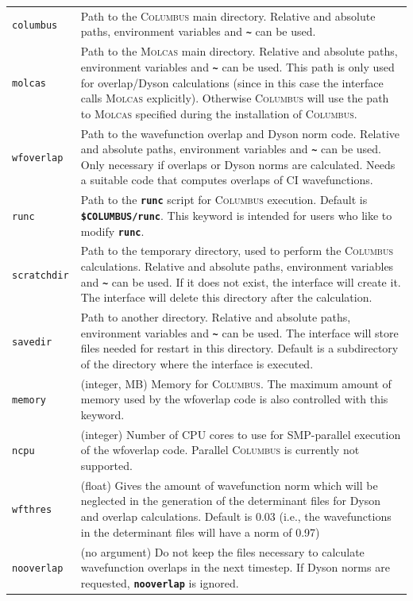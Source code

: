 \documentclass[a4paper,11pt,DIV=15,openany,twoside=false]{scrbook}
\newcommand{\ttt}[1]{\textbf{\texttt{#1}}}
\begin{document}
\begin{longtable}{>{\tt}lp{12cm}}
columbus        &Path to the \textsc{Columbus} main directory. Relative and absolute paths, environment variables and \ttt{\textasciitilde} can be used.\\
molcas          &Path to the \textsc{Molcas} main directory.  Relative and absolute paths, environment variables and \ttt{\textasciitilde} can be used. This path is only used for overlap/Dyson calculations (since in this case the interface calls \textsc{Molcas} explicitly). Otherwise \textsc{Columbus} will use the path to \textsc{Molcas} specified during the installation of \textsc{Columbus}.\\
wfoverlap       &Path to the wavefunction overlap and Dyson norm code. Relative and absolute paths, environment variables and \ttt{\textasciitilde} can be used. Only necessary if overlaps or Dyson norms are calculated. Needs a suitable code that computes overlaps of CI wavefunctions.\\
runc            &Path to the \ttt{runc} script for \textsc{Columbus} execution. Default is \ttt{\$COLUMBUS/runc}. This keyword is intended for users who like to modify \ttt{runc}.\\
scratchdir      &Path to the temporary directory, used to perform the \textsc{Columbus} calculations. Relative and absolute paths, environment variables and \ttt{\textasciitilde} can be used. If it does not exist, the interface will create it. The interface will delete this directory after the calculation.\\
savedir         &Path to another directory.  Relative and absolute paths, environment variables and \ttt{\textasciitilde} can be used. The interface will store files needed for restart in this directory. Default is a subdirectory of the directory where the interface is executed.\\
memory          &(integer, MB) Memory for \textsc{Columbus}. The maximum amount of memory used by the wfoverlap code is also controlled with this keyword.\\
ncpu            &(integer) Number of CPU cores to use for SMP-parallel execution of the wfoverlap code. Parallel \textsc{Columbus} is currently not supported.\\
wfthres         &(float) Gives the amount of wavefunction norm which will be neglected in the generation of the determinant files for Dyson and overlap calculations. Default is 0.03 (i.e., the wavefunctions in the determinant files will have a norm of 0.97)\\
nooverlap       &(no argument) Do not keep the files necessary to calculate wavefunction overlaps in the next timestep. If Dyson norms are requested, \ttt{nooverlap} is ignored.\\

\end{longtable}
\end{document}

